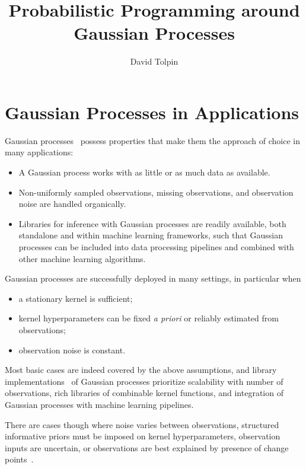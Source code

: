 \documentclass[sigplan,review]{acmart}\settopmatter{printfolios=true,printccs=false,printacmref=false}
\title{Probabilistic Programming around Gaussian Processes}
\author{David Tolpin}
\affiliation{
    \institution{PUB+}
    \country{Israel}
}
\begin{document}
\maketitle

\section{Gaussian Processes in Applications}

Gaussian processes~\cite{RW05} possess properties that make
them the approach of choice in many applications:
\begin{itemize}
    \item A Gaussian process works with as little or as much
    	data as available.
    \item Non-uniformly sampled observations, missing
    	observations, and observation noise are handled
    	organically.
    \item Libraries for inference with Gaussian processes
    	are readily available, both standalone and within
    	machine learning frameworks, such that Gaussian
    	processes can be included into data processing
    	pipelines and combined with other machine learning
    	algorithms.
\end{itemize}

Gaussian processes are successfully deployed in many settings,
in particular when 
\begin{itemize}
    \item a stationary kernel is sufficient;
    \item kernel hyperparameters can be fixed \textit{a priori} or
    	reliably estimated from observations;
    \item observation noise is constant.
\end{itemize}
Most basic cases are indeed covered by the above assumptions,
and library implementations~\cite{MWN+17,GPB+18,PVG+11} of
Gaussian processes prioritize scalability with number of
observations, rich libraries of combinable kernel functions, and
integration of Gaussian processes with machine learning
pipelines.

There are cases though where noise varies between
observations, structured informative priors must be imposed on
kernel hyperparameters, observation inputs are uncertain, or
observations are best explained by presence of change
points~\cite{ROE+13,SGR04,GOR09,MR11,STR10}.
\end{document}
